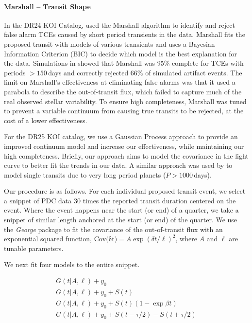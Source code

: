 \paragraph{Marshall -- Transit Shape}
\label{s:marshall}
In the DR24 KOI Catalog, \citet{Coughlin2016} used the Marshall algorithm \citep{Mullally2016} to identify and reject false alarm TCEs caused by short period transients in the data. Marshall fits the proposed transit with models of various transients and uses a Bayesian Information Criterion (BIC) to decide which model is the best explanation for the data. Simulations in \citet{Mullally2016} showed that Marshall was 95\% complete for TCEs with periods $>150$\,days and correctly rejected 66\% of simulated artifact events. The limit on Marshall's effectiveness at eliminating false alarms was that it used a parabola to describe the out-of-transit flux, which failed to capture much of the real observed stellar variability. To ensure high completeness, Marshall was tuned to prevent a variable continuum from causing true transits to be rejected, at the cost of a lower effectiveness.

For the DR25 KOI catalog, we use a Gaussian Process approach \citep[GP,][]{Rasmussen10} to provide an improved continuum model and increase our effectiveness, while maintaining our high completeness. Briefly, our approach aims to model the covariance in the light curve to better fit the trends in our data.
A similar approach was used by \citet{ForemanMackey16} to model single transits due to very long period planets ($P > 1000$\,days).

Our procedure is as follows. For each individual proposed transit event, we select a snippet of PDC data 30 times the reported transit duration centered on the event. Where the event happens near the start (or end) of a quarter, we take a snippet of similar length anchored at the start (or end) of the quarter. We use the \emph{George} package \citep{Ambikasaran14} to fit the covariance of the out-of-transit flux with an exponential squared function, $ {\mathrm{Cov(\delta t})} = A \exp{ (\delta t/\ell)^2}$, where $A$ and $\ell$ are tunable parameters. 

We next fit four models to the entire snippet.

\begin{equation}
\left.\begin{aligned}
G(t | A, \ell) + y_0 \\
G(t | A, \ell) + y_0 + S(t)\\
G(t | A, \ell) + y_0 + S(t)(1 - \exp{\beta t})\\
G(t | A, \ell) + y_0 + S(t - \tau/2) - S(t + \tau/2) 
\end{aligned}\right.
\label{e:marshall}
\end{equation}

